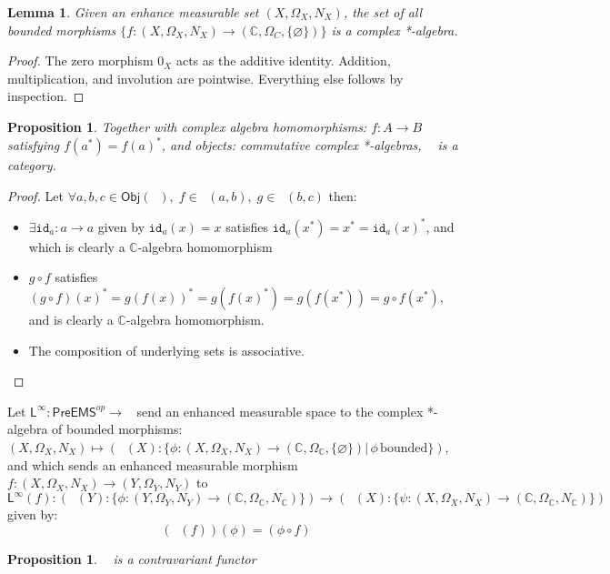 \documentclass{article}
\newcommand{\C}{\mathbb{C}}
\newtheorem{proposition}[subsection]{Proposition}
\newtheorem{lemma}[subsection]{Lemma}
\DeclareMathOperator{\calg}{\textsf{CAlg}^{*}_{\mathbb{C}}}
\DeclareMathOperator{\linf}{L^\infty}
\begin{document}
\begin{lemma}
	Given an enhance measurable set $(X,\Omega_X,N_X)$, the set of all bounded morphisms $\{f: (X,\Omega_X,N_X)\rightarrow{}(\C,\Omega_C,\{\varnothing\})\}$ is a complex *-algebra.
\end{lemma}
\begin{proof}
	The zero morphism $0_X$ acts as the additive identity.  Addition, multiplication, and involution are pointwise.  Everything else follows by inspection.
\end{proof}
\begin{proposition}
	Together with complex algebra homomorphisms: $f: A\rightarrow{B}$ satisfying $f(a^*) = f(a)^*$, and objects: commutative complex *-algebras, $\calg$ is a category.
\end{proposition}
\begin{proof}
	Let $\forall a,b,c\in\textsf{Obj}(\calg),\;f\in\calg(a,b),\;g\in\calg(b,c)$ then:
	\begin{itemize}
		\item $\exists \texttt{id}_{a}:a\rightarrow{a}$ given by $\texttt{id}_a(x)=x$ satisfies $\texttt{id}_a(x^*) = x^* = \texttt{id}_a(x)^*$, and which is clearly a $\C$-algebra homomorphism
		\item $g\circ{f}$ satisfies $(g\circ{f})(x)^* = g(f(x))^* = g(f(x)^*) = g(f(x^*)) = g\circ{f}(x^*)$, and is clearly a $\C$-algebra homomorphism.
		\item The composition of underlying sets is associative.
	\end{itemize}
\end{proof}
	Let $\textsf{L}^\infty: \textsf{PreEMS}^{op}\rightarrow{\calg}$ send an enhanced measurable space to the complex *-algebra of bounded morphisms: $(X,\Omega_X,N_X) \mapsto (\linf(X): \{\phi: (X,\Omega_X,N_X)\rightarrow(\C,\Omega_\C, \{\varnothing\})|\,\phi\,\text{bounded}\})$, and which sends an enhanced measurable morphism $f: (X,\Omega_X,N_X)\rightarrow{}(Y,\Omega_Y,N_Y)$ to \begin{equation*}
\textsf{L}^\infty(f) : (\linf(Y) : \{\phi:(Y,\Omega_Y,N_Y)\rightarrow(\C,\Omega_{\C},N_\C)\})\rightarrow{}(\linf(X) : \{\psi : (X,\Omega_X,N_X)\rightarrow(\C,\Omega_\C,N_\C)\})
	\end{equation*}
given by:
\begin{equation*}
	(\linf(f))(\phi) = (\phi\circ{}f)
\end{equation*}
\begin{proposition}
	$\linf$ is a contravariant functor
\end{proposition}
\end{document}
